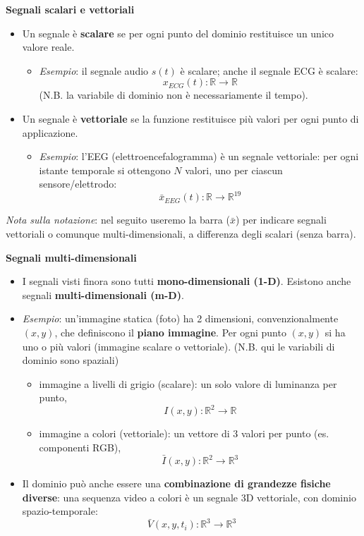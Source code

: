 \documentclass[12pt, a4paper]{article}
\begin{document}
\textbf{Segnali scalari e vettoriali}
\begin{itemize}
    \item Un segnale è \textbf{scalare} se per ogni punto del dominio restituisce un unico valore reale.
    \begin{itemize}
        \item \textit{Esempio}: il segnale audio $s(t)$ è scalare; anche il segnale ECG è scalare:
        $$x_{ECG}(t): \mathbb{R} \to \mathbb{R}$$
        (N.B. la variabile di dominio non è necessariamente il tempo).
    \end{itemize}
    \item Un segnale è \textbf{vettoriale} se la funzione restituisce più valori per ogni punto di applicazione.
    \begin{itemize}
        \item \textit{Esempio}: l'EEG (elettroencefalogramma) è un segnale vettoriale: per ogni istante temporale si ottengono $N$ valori, uno per ciascun sensore/elettrodo:
        $$\bar{x}_{EEG}(t): \mathbb{R} \to \mathbb{R}^{19}$$
    \end{itemize}
\end{itemize}

\textit{Nota sulla notazione}: nel seguito useremo la barra ($\bar{x}$) per indicare segnali vettoriali o comunque multi-dimensionali, a differenza degli scalari (senza barra).

\textbf{Segnali multi-dimensionali}
\begin{itemize}
    \item I segnali visti finora sono tutti \textbf{mono-dimensionali (1-D)}. Esistono anche segnali \textbf{multi-dimensionali (m-D)}.
    \item \textit{Esempio}: un'immagine statica (foto) ha 2 dimensioni, convenzionalmente $(x,y)$, che definiscono il \textbf{piano immagine}. Per ogni punto $(x,y)$ si ha uno o più valori (immagine scalare o vettoriale). (N.B. qui le variabili di dominio sono spaziali)
    \begin{itemize}
        \item immagine a livelli di grigio (scalare): un solo valore di luminanza per punto,
        $$I(x,y): \mathbb{R}^2 \to \mathbb{R}$$
        \item immagine a colori (vettoriale): un vettore di 3 valori per punto (es. componenti RGB),
        $$\bar{I}(x,y): \mathbb{R}^2 \to \mathbb{R}^3$$
    \end{itemize}
    \item Il dominio può anche essere una \textbf{combinazione di grandezze fisiche diverse}: una sequenza video a colori è un segnale 3D vettoriale, con dominio spazio-temporale:
    $$\bar{V}(x,y,t_i): \mathbb{R}^3 \to \mathbb{R}^3$$
\end{itemize}
\end{document}
